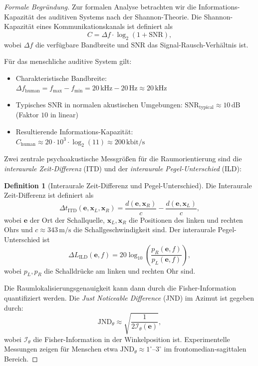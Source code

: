 ﻿\documentclass[12pt, a4paper]{article}
\theoremstyle{definition}
\newtheorem{definition}{Definition}[section]
\theoremstyle{remark}
\begin{document}
\begin{proof}[Formale Begründung]
Zur formalen Analyse betrachten wir die Informations-Kapazität des auditiven Systems nach der Shannon-Theorie. Die Shannon-Kapazität eines Kommunikationskanals ist definiert als
\begin{equation}
C = \Delta f \cdot \log_2(1 + \text{SNR}),
\label{eq:shannon_capacity}
\end{equation}
wobei $\Delta f$ die verfügbare Bandbreite und $\text{SNR}$ das Signal-Rausch-Verhältnis ist.

Für das menschliche auditive System gilt:
\begin{itemize}
\item Charakteristische Bandbreite: $\Delta f_{\text{human}} = f_{\max} - f_{\min} = 20\,\mathrm{kHz} - 20\,\mathrm{Hz} \approx 20\,\mathrm{kHz}$
\item Typisches SNR in normalen akustischen Umgebungen: $\text{SNR}_{\text{typical}} \approx 10\,\mathrm{dB}$ (Faktor $10$ in linear)
\item Resultierende Informations-Kapazität: $C_{\text{human}} \approx 20 \cdot 10^3 \cdot \log_2(11) \approx 200\,\mathrm{kbit/s}$
\end{itemize}

Zwei zentrale psychoakustische Messgrößen für die Raumorientierung sind die \emph{interaurale Zeit-Differenz} (ITD) und der \emph{interaurale Pegel-Unterschied} (ILD):

\begin{definition}[Interaurale Zeit-Differenz und Pegel-Unterschied]
Die Interaurale Zeit-Differenz ist definiert als
\begin{equation}
\Delta t_{\text{ITD}}(\mathbf{e}, \mathbf{x}_L, \mathbf{x}_R) = 
\frac{d(\mathbf{e}, \mathbf{x}_R)}{c} - \frac{d(\mathbf{e}, \mathbf{x}_L)}{c},
\label{eq:itd}
\end{equation}
wobei $\mathbf{e}$ der Ort der Schallquelle, $\mathbf{x}_L, \mathbf{x}_R$ die Positionen des linken und rechten Ohrs und $c \approx 343\,\mathrm{m/s}$ die Schallgeschwindigkeit sind. Der interaurale Pegel-Unterschied ist
\begin{equation}
\Delta L_{\text{ILD}}(\mathbf{e}, f) = 20\log_{10}\left(\frac{p_R(\mathbf{e}, f)}{p_L(\mathbf{e}, f)}\right),
\label{eq:ild}
\end{equation}
wobei $p_L, p_R$ die Schalldrücke am linken und rechten Ohr sind.
\end{definition}

Die Raumlokalisierungsgenauigkeit kann dann durch die Fisher-Information quantifiziert werden. Die \emph{Just Noticeable Difference} (JND) im Azimut ist gegeben durch:
\begin{equation}
\text{JND}_\theta \approx \sqrt{\frac{1}{2\mathcal{I}_\theta(\mathbf{e})}},
\label{eq:jnd_fisher}
\end{equation}
wobei $\mathcal{I}_\theta$ die Fisher-Information in der Winkelposition ist. Experimentelle Messungen zeigen für Menschen etwa $\text{JND}_\theta \approx 1^\circ$--$3^\circ$ im frontomedian-sagittalen Bereich.


\end{proof}
\end{document}
